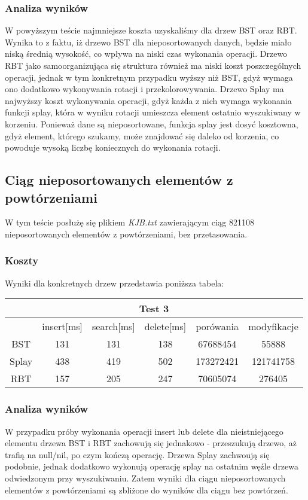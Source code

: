 \documentclass[titlepage]{article}
\begin{document}
\subsubsection{Analiza wyników}
W powyższym teście najmniejsze koszta uzyskaliśmy dla drzew BST oraz RBT. Wynika to z faktu, iż drzewo BST dla nieposortowanych danych, będzie miało niską średnią wysokość, co wpływa na niski czas wykonania operacji. Drzewo RBT jako samoorganizująca się struktura również ma niski koszt poszczególnych operacji, jednak w tym konkretnym przypadku wyższy niż BST, gdyż wymaga ono dodatkowo wykonywania rotacji i przekolorowywania. Drzewo Splay ma najwyższy koszt wykonywania operacji, gdyż każda z nich wymaga wykonania funkcji splay, która w wyniku rotacji umieszcza element ostatnio wyszukiwany w korzeniu. Ponieważ dane są nieposortowane, funkcja splay jest dosyć kosztowna, gdyż element, którego szukamy, może znajdować się daleko od korzenia, co powoduje wysoką liczbę koniecznych do wykonania rotacji. 

\subsection{Ciąg nieposortowanych elementów z powtórzeniami}
W tym teście posłużę się plikiem \textit{KJB.txt} zawierającym ciąg 821108 nieposortowanych elementów z powtórzeniami, bez przetasowania.
\pagebreak
\subsubsection{Koszty}
Wyniki dla konkretnych drzew przedstawia poniższa tabela: 
\begin{table}[h!]
	\centering
    \label{tab:table3}
    \begin{tabular}{|c|c|c|c|c|c|}
    		\multicolumn{6}{c}{Test 3}\\
    		\hline
      	& insert[ms] & search[ms] & delete[ms] & porówania & modyfikacje\\
      	\hline
      	BST & 131 & 131 & 138 & 67688454 & 55888\\
      	\hline
      	Splay & 438 & 419 & 502 & 173272421 & 121741758\\
      	\hline
      	RBT & 157 & 205 & 247 & 70605074 & 276405\\
		\hline
    \end{tabular}
\end{table}

\subsubsection{Analiza wyników}
W przypadku próby wykonania operacji insert lub delete dla nieistniejącego elementu drzewa BST i RBT zachowują się jednakowo - przeszukują drzewo, aż trafią na null/nil, po czym kończą operację. Drzewa Splay zachwoują się podobnie, jednak dodatkowo wykonują operację splay na ostatnim węźle drzewa odwiedzonym przy wyszukiwaniu. Zatem wyniki dla ciągu nieposortowanych elementów z powtórzeniami są zbliżone do wyników dla ciągu bez powtórzeń.
\end{document}
